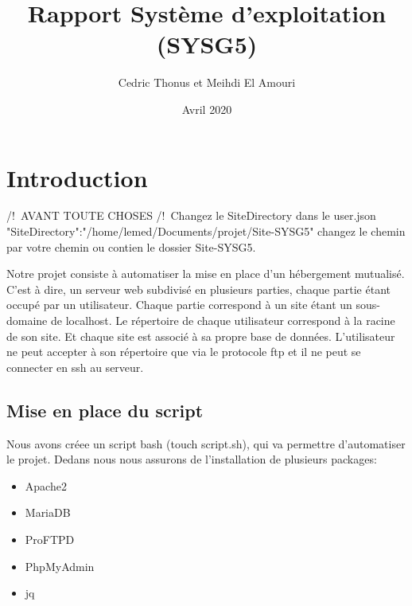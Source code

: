 \documentclass{article}
\title{Rapport Système d'exploitation (SYSG5)}
\date{Avril 2020}
\author{Cedric Thonus et Meihdi El Amouri}
\begin{document}
	\maketitle
	\section{Introduction}
	/!\ AVANT TOUTE CHOSES /!\ 
		Changez le SiteDirectory dans le user.json "SiteDirectory":"/home/lemed/Documents/projet/Site-SYSG5" changez le chemin par votre chemin ou contien le dossier Site-SYSG5.
	
	Notre projet consiste à automatiser la mise en place d'un hébergement mutualisé. C'est à dire, un serveur web subdivisé en plusieurs parties, chaque partie étant occupé par un utilisateur. Chaque partie correspond à un site étant un sous-domaine de localhost. Le répertoire de chaque utilisateur correspond à la racine de son site. Et chaque site est associé à sa propre  base de données. L'utilisateur ne peut accepter à son répertoire que via le protocole ftp et il ne peut se connecter en ssh au serveur.
	\subsection{Mise en place du script}
	Nous avons créee un script bash (touch script.sh), qui va permettre d'automatiser le projet. Dedans nous nous assurons de l'installation de plusieurs packages: 
	\begin{itemize}
		\item Apache2
		\item MariaDB
		\item ProFTPD
		\item PhpMyAdmin
		\item jq
	\end{itemize}
\end{document}

